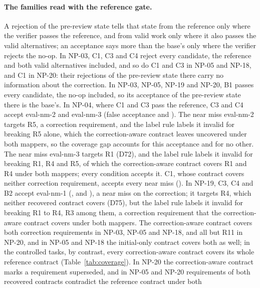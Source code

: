 \paragraph{The families read with the reference gate.}
A rejection of the pre-review state tells that state from the reference only where the verifier passes the reference,
and from valid work only where it also passes the valid alternatives; an acceptance says more than the base's only where
the verifier rejects the no-op. In NP-03, C1, C3 and C4 reject every candidate, the reference and both valid
alternatives included, and so do C1 and C3 in NP-05 and NP-18, and C1 in NP-20: their rejections of the pre-review state
there carry no information about the correction. In NP-03, NP-05, NP-19 and NP-20, B1 passes every candidate, the no-op
included, so its acceptance of the pre-review state there is the base's. In NP-04, where C1 and C3 pass the reference,
C3 and C4 accept eval-nm-2 and eval-nm-3 (false acceptance  and ). The near miss
eval-nm-2 targets R5, a correction requirement, and the label rule labels it invalid for breaking R5 alone, which the
correction-aware contract leaves uncovered under both mappers, so the coverage gap accounts for this acceptance and for
no other. The near miss eval-nm-3 targets R1 (D72), and the label rule labels it invalid for breaking R1, R4 and R5, of
which the correction-aware contract covers R1 and R4 under both mappers; every condition accepts it. C1, whose contract
covers neither correction requirement, accepts every near miss (). In NP-19, C3, C4 and B2 accept
eval-nm-1 (,  and ), a near miss on the correction; it targets R4, which
neither recovered contract covers (D75), but the label rule labels it invalid for breaking R1 to R4, R3 among them, a
correction requirement that the correction-aware contract covers under both mappers. The correction-aware contract
covers both correction requirements in NP-03, NP-05 and NP-18, and all but R11 in NP-20, and in NP-05 and NP-18 the
initial-only contract covers both as well; in the controlled tasks, by contrast, every correction-aware contract covers
its whole reference contract (Table~\ref{tab:coverage}). In NP-20 the correction-aware contract marks a requirement
superseded, and in NP-05 and NP-20 requirements of both recovered contracts contradict the reference contract under both
